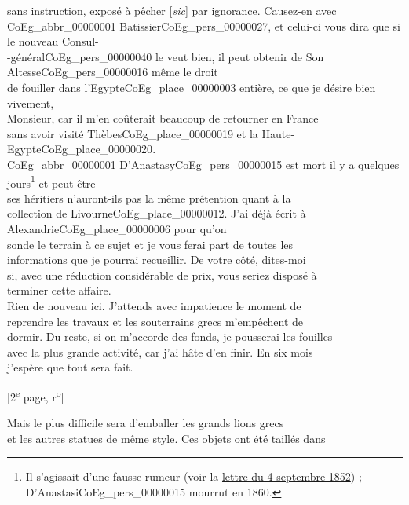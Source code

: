 \documentclass{book}
\begin{document}
sans instruction, exposé à pêcher {[\textit{sic}]} par ignorance. Causez-en avec\\
\gls{CoEg_abbr_00000001} Batissier\gls{CoEg_pers_00000027}, et celui-ci vous dira que si le nouveau Consul-\\
-général\gls{CoEg_pers_00000040} le veut bien, il peut obtenir de Son Altesse\gls{CoEg_pers_00000016} même le droit\\
de fouiller dans l’Egypte\gls{CoEg_place_00000003} entière, ce que je désire bien vivement,\\
Monsieur, car il m’en coûterait beaucoup de retourner en France\\
sans avoir visité Thèbes\gls{CoEg_place_00000019} et la Haute-Egypte\gls{CoEg_place_00000020}.\\
\indent \gls{CoEg_abbr_00000001} D’Anastasy\gls{CoEg_pers_00000015} est mort il y a quelques jours\footnote{Il s'agissait d'une fausse rumeur (voir la \hyperref[CoEg_Mariette_1852-09-04]{lettre du 4 septembre 1852}) ; D'Anastasi\gls{CoEg_pers_00000015} mourrut en 1860.} et peut-être\\
ses héritiers n’auront-ils pas la même prétention quant à la\\
collection de Livourne\gls{CoEg_place_00000012}. J’ai déjà écrit à Alexandrie\gls{CoEg_place_00000006} pour qu’on\\
sonde le terrain à ce sujet et je vous ferai part de toutes les\\
informations que je pourrai recueillir. De votre côté, dites-moi\\
si, avec une réduction considérable de prix, vous seriez disposé à\\
terminer cette affaire.\\
\indent Rien de nouveau ici. J’attends avec impatience le moment de\\
reprendre les travaux et les souterrains grecs m’empêchent de\\
dormir. Du reste, si on m’accorde des fonds, je pousserai les fouilles\\
avec la plus grande activité, car j’ai hâte d’en finir. En six mois\\
j’espère que tout sera fait.
{\footnotesize \begin{center} {[2\textsuperscript{e} page, r\textsuperscript{o}]}\end{center}}
\indent Mais le plus difficile sera d’emballer les grands lions grecs\\
et les autres statues de même style. Ces objets ont été taillés dans\\
\end{document}
